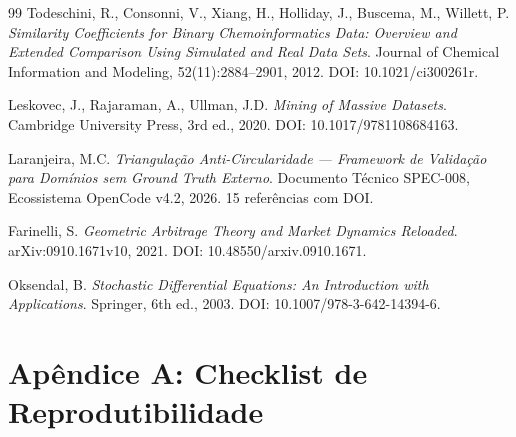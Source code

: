 \documentclass[12pt,a4paper]{article}
\theoremstyle{remark}
\begin{document}
\begin{thebibliography}{99}
Todeschini, R., Consonni, V., Xiang, H., Holliday, J., Buscema, M., Willett, P. \textit{Similarity Coefficients for Binary Chemoinformatics Data: Overview and Extended Comparison Using Simulated and Real Data Sets}. Journal of Chemical Information and Modeling, 52(11):2884--2901, 2012. DOI: 10.1021/ci300261r.

Leskovec, J., Rajaraman, A., Ullman, J.D. \textit{Mining of Massive Datasets}. Cambridge University Press, 3rd ed., 2020. DOI: 10.1017/9781108684163.

Laranjeira, M.C. \textit{Triangulação Anti-Circularidade — Framework de Validação para Domínios sem Ground Truth Externo}. Documento Técnico SPEC-008, Ecossistema OpenCode v4.2, 2026. 15 referências com DOI.

Farinelli, S. \textit{Geometric Arbitrage Theory and Market Dynamics Reloaded}. arXiv:0910.1671v10, 2021. DOI: 10.48550/arxiv.0910.1671.

Oksendal, B. \textit{Stochastic Differential Equations: An Introduction with Applications}. Springer, 6th ed., 2003. DOI: 10.1007/978-3-642-14394-6.

\end{thebibliography}

\newpage

\section*{Apêndice A: Checklist de Reprodutibilidade}
\end{document}

